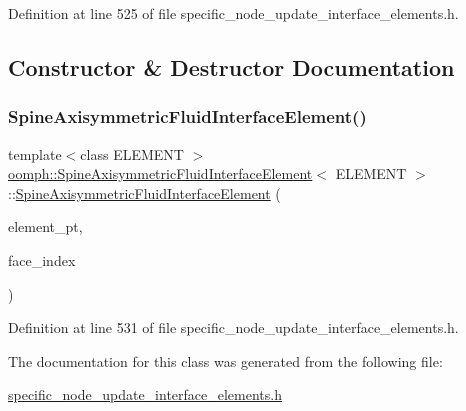 Definition at line 525 of file specific\+\_\+node\+\_\+update\+\_\+interface\+\_\+elements.\+h.



\subsection{Constructor \& Destructor Documentation}
\mbox{\label{classoomph_1_1SpineAxisymmetricFluidInterfaceElement_a66aaa2581711338cf66660d97663d7cb}} 
\subsubsection{\texorpdfstring{Spine\+Axisymmetric\+Fluid\+Interface\+Element()}{SpineAxisymmetricFluidInterfaceElement()}}
{\footnotesize\ttfamily template$<$class E\+L\+E\+M\+E\+NT $>$ \\
\hyperlink{classoomph_1_1SpineAxisymmetricFluidInterfaceElement}{oomph\+::\+Spine\+Axisymmetric\+Fluid\+Interface\+Element}$<$ E\+L\+E\+M\+E\+NT $>$\+::\hyperlink{classoomph_1_1SpineAxisymmetricFluidInterfaceElement}{Spine\+Axisymmetric\+Fluid\+Interface\+Element} (\begin{DoxyParamCaption}\item[{Finite\+Element $\ast$const \&}]{element\+\_\+pt,  }\item[{const int \&}]{face\+\_\+index }\end{DoxyParamCaption})\hspace{0.3cm}{\ttfamily [inline]}}



Definition at line 531 of file specific\+\_\+node\+\_\+update\+\_\+interface\+\_\+elements.\+h.



The documentation for this class was generated from the following file\+:\begin{DoxyCompactItemize}
\item 
\hyperlink{specific__node__update__interface__elements_8h}{specific\+\_\+node\+\_\+update\+\_\+interface\+\_\+elements.\+h}\end{DoxyCompactItemize}

